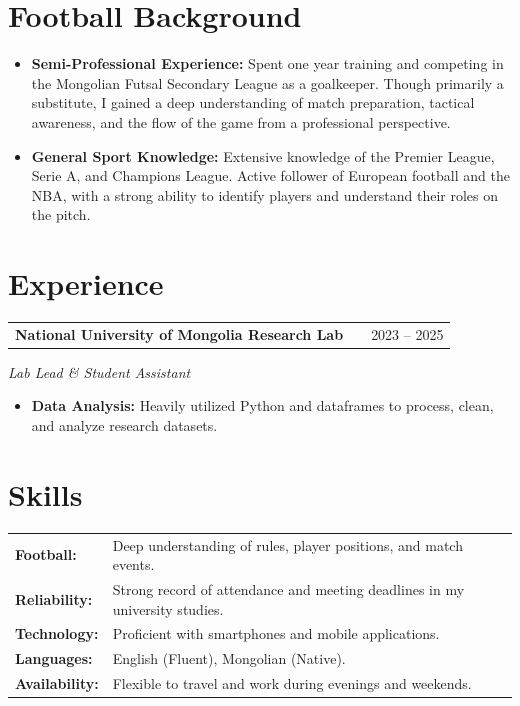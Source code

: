 \documentclass[a4paper,12pt]{article}
\makeatletter
\newenvironment{jobshort}[2]
    {
    \begin{tabularx}{\linewidth}{@{}l X r@{}}
    \textbf{#1} & \hfill &  #2 \\[3.75pt]
    \end{tabularx}
    }
    {
    }
\makeatother
\begin{document}
\section{Football Background}
\begin{itemize}[nosep,after=\strut,leftmargin=1em,itemsep=4pt,label=--]
    \item \textbf{Semi-Professional Experience:} Spent one year training and competing in the Mongolian Futsal Secondary League as a goalkeeper. Though primarily a substitute, I gained a deep understanding of match preparation, tactical awareness, and the flow of the game from a professional perspective.
    \item \textbf{General Sport Knowledge:} Extensive knowledge of the Premier League, Serie A, and Champions League. Active follower of European football and the NBA, with a strong ability to identify players and understand their roles on the pitch.
\end{itemize}

\section{Experience}
\begin{jobshort}{National University of Mongolia Research Lab}{2023 -- 2025}
\textit{Lab Lead \& Student Assistant} \hfill 
\begin{itemize}[nosep,after=\strut,leftmargin=1em,itemsep=3pt,label=--]
\item \textbf{Data Analysis:} Heavily utilized Python and dataframes to process, clean, and analyze research datasets.

\end{itemize}
\end{jobshort}

\section{Skills}
\begin{tabularx}{\linewidth}{@{}l X@{}}
\textbf{Football:} & Deep understanding of rules, player positions, and match events. \\
\textbf{Reliability:} & Strong record of attendance and meeting deadlines in my university studies. \\
\textbf{Technology:} & Proficient with smartphones and mobile applications. \\
\textbf{Languages:} & English (Fluent), Mongolian (Native). \\
\textbf{Availability:} & Flexible to travel and work during evenings and weekends. \\
\end{tabularx}
\end{document}
